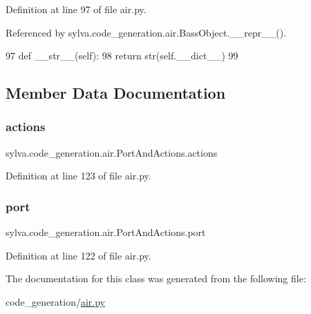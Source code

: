 Definition at line 97 of file air.\+py.



Referenced by sylva.\+code\+\_\+generation.\+air.\+Bass\+Object.\+\_\+\+\_\+repr\+\_\+\+\_\+().


\begin{DoxyCode}
97     \textcolor{keyword}{def }\_\_str\_\_(self):
98         \textcolor{keywordflow}{return} str(self.\_\_dict\_\_)
99 
\end{DoxyCode}


\subsection{Member Data Documentation}
\mbox{\label{classsylva_1_1code__generation_1_1air_1_1_port_and_actions_aaeb765c205fcb8c38025428542025ba7}} 
\subsubsection{\texorpdfstring{actions}{actions}}
{\footnotesize\ttfamily sylva.\+code\+\_\+generation.\+air.\+Port\+And\+Actions.\+actions}



Definition at line 123 of file air.\+py.

\mbox{\label{classsylva_1_1code__generation_1_1air_1_1_port_and_actions_a6b5a21780c1b3cc8879c05a5dfdd65bf}} 
\subsubsection{\texorpdfstring{port}{port}}
{\footnotesize\ttfamily sylva.\+code\+\_\+generation.\+air.\+Port\+And\+Actions.\+port}



Definition at line 122 of file air.\+py.



The documentation for this class was generated from the following file\+:\begin{DoxyCompactItemize}
\item 
code\+\_\+generation/\hyperlink{air_8py}{air.\+py}\end{DoxyCompactItemize}
